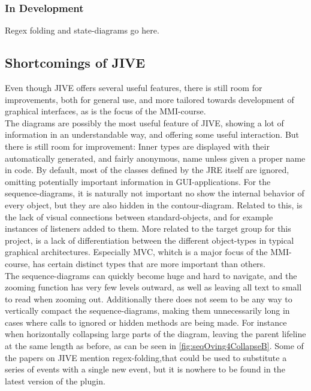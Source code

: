 \subsubsection{In Development}\label{jiveInDev}

Regex folding and state-diagrams go here.


\subsection{Shortcomings of JIVE}\label{jiveShortcomings}

Even though JIVE offers several useful features, there is still room for improvements, both for general use, and more tailored towards development of graphical interfaces, as is the focus of the MMI-course.
~\\

The diagrams are possibly the most useful feature of JIVE, showing a lot of information in an understandable way, and offering some useful interaction.
But there is still room for improvement:
Inner types are displayed with their automatically generated, and fairly anonymous, name unless given a proper name in code.
By default, most of the classes defined by the JRE itself are ignored, omitting potentially important information in GUI-applications.
For the sequence-diagrams, it is naturally not important no show the internal behavior of every object, but they are also hidden in the contour-diagram.
Related to this, is the lack of visual connections between standard-objects, and for example instances of listeners added to them.
More related to the target group for this project, is a lack of differentiation between the different object-types in typical graphical architectures.
Especially MVC, whitch is a major focus of the MMI-course, has certain distinct types that are more important than others.
~\\

The sequence-diagrams can quickly become huge and hard to navigate, and the zooming function has very few levels outward, as well as leaving all text to small to read when zooming out.
Additionally there does not seem to be any way to vertically compact the sequence-diagrams, making them unnecessarily long in cases where calls to ignored or hidden methods are being made.
For instance when horizontally collapsing large parts of the diagram, leaving the parent lifeline at the same length as before, as can be seen in \autoref{fig:seqOving4CollapseB}.
Some of the papers on JIVE mention regex-folding,that could be used to substitute a series of events with a single new event, but it is nowhere to be found in the latest version of the plugin.
~\\

